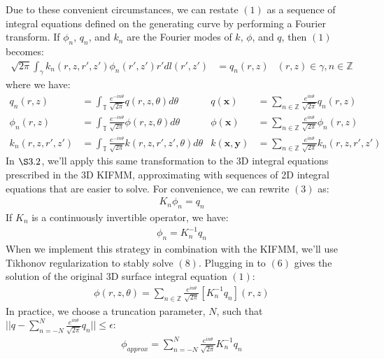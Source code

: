 \documentclass[12pt,letterpaper]{article}
\renewcommand{\le}{\leqslant}
\begin{document}
Due to these convenient circumstances, we can restate $(1)$ as a sequence of integral equations defined on the generating curve by performing a Fourier transform. If $\phi_n$, $q_n$, and $k_n$ are the Fourier modes of $k$, $\phi$, and $q$, then $(1)$ becomes:
\begin{align}
\sqrt{2\pi}\int_\gamma k_n(r,z,r',z')\phi_n(r',z')r'dl(r',z')&=q_n(r,z) &(r,z)\in\gamma, n\in\mathbb{Z}
\end{align}
where we have:
\begin{align}
q_n(r,z)&=\int_\mathbb{T}\frac{e^{-in\theta}}{\sqrt{2\pi}}q(r,z,\theta)d\theta&q(\mathbf{x})&=\sum_{n\in\mathbb{Z}}\frac{e^{in\theta}}{\sqrt{2\pi}}q_n(r,z)\\
\phi_n(r,z)&=\int_\mathbb{T}\frac{e^{-in\theta}}{\sqrt{2\pi}}\phi(r,z,\theta)d\theta&\phi(\mathbf{x})&=\sum_{n\in\mathbb{Z}}\frac{e^{in\theta}}{\sqrt{2\pi}}\phi_n(r,z)\\
k_n(r,z,r',z')&=\int_\mathbb{T}\frac{e^{-in\theta}}{\sqrt{2\pi}}k(r,z,r',z',\theta)d\theta&k(\mathbf{x},\mathbf{y})&=\sum_{n\in\mathbb{Z}}\frac{e^{in\theta}}{\sqrt{2\pi}}k_n(r,z,r',z')
\end{align}
In $\S3.2$, we'll apply this same transformation to the 3D integral equations prescribed in the 3D KIFMM, approximating with sequences of 2D integral equations that are easier to solve. For convenience, we can rewrite $(3)$ as:
\begin{align}
K_n\phi_n=q_n
\end{align}
If $K_n$ is a continuously invertible operator, we have:
\begin{align}
\phi_n=K_n^{-1}q_n
\end{align}
When we implement this strategy in combination with the KIFMM, we'll use Tikhonov regularization to stably solve $(8)$. Plugging in to $(6)$ gives the solution of the original 3D surface integral equation $(1)$:
\begin{align}
\phi(r,z,\theta)=\sum_{n\in\mathbb{Z}}\frac{e^{in\theta}}{\sqrt{2\pi}}[K_n^{-1}q_n](r,z)
\end{align}
In practice, we choose a truncation parameter, $N$, such that $||q-\sum\limits_{n=-N}^{N}\frac{e^{in\theta}}{\sqrt{2\pi}}q_n||\le\epsilon$:
\begin{align}
\phi_{approx}=\sum_{n=-N}^N\frac{e^{in\theta}}{\sqrt{2\pi}}K_n^{-1}q_n
\end{align}
\end{document}
